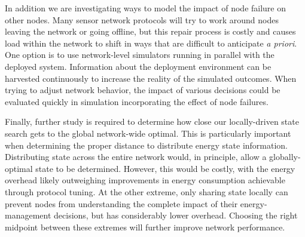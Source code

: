 \clearpage

In addition we are investigating ways to model the impact of node failure on
other nodes. Many sensor network protocols will try to work around nodes
leaving the network or going offline, but this repair process is costly and
causes load within the network to shift in ways that are difficult to
anticipate \textit{a priori}. One option is to use network-level simulators
running in parallel with the deployed system. Information about the
deployment environment can be harvested continuously to increase the reality
of the simulated outcomes. When trying to adjust network behavior, the impact
of various decisions could be evaluated quickly in simulation incorporating
the effect of node failures.

Finally, further study is required to determine how close our locally-driven
state search gets to the global network-wide optimal. This is particularly
important when determining the proper distance to distribute energy state
information. Distributing state across the entire network would, in
principle, allow a globally-optimal state to be determined. However, this
would be costly, with the energy overhead likely outweighing improvements in
energy consumption achievable through protocol tuning. At the other extreme,
only sharing state locally can prevent nodes from understanding the complete
impact of their energy-management decisions, but has considerably lower
overhead. Choosing the right midpoint between these extremes will further
improve network performance.
